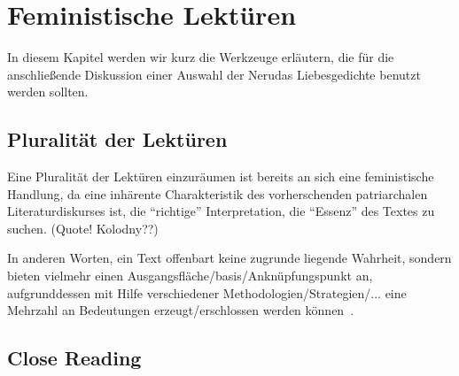 \section{Feministische Lektüren}

In diesem Kapitel werden wir kurz die Werkzeuge erläutern, die für die anschließende Diskussion einer Auswahl der Nerudas Liebesgedichte benutzt werden sollten.

\subsection{Pluralität der Lektüren}

Eine Pluralität der Lektüren einzuräumen ist bereits an sich eine feministische Handlung,
da eine inhärente Charakteristik des vorherschenden patriarchalen Literaturdiskurses ist, die ``richtige'' Interpretation, die ``Essenz'' des Textes zu suchen. (Quote! Kolodny??)
\begin{comment}
   * Pluralität (vlt in die Intro vorziehen)
     Annette Kolodny: "In my view, our purpose is not and should not be the formulation of any single reading method or potentially procrustean set of critical procedures[...] Instead, as I se it, our task is to initiate nothing less than a playful pluralism, responsice to the possibilities of multiple critical schools and methods, but captive of none.."
\end{comment}

In anderen Worten, ein Text offenbart keine zugrunde liegende Wahrheit, sondern bieten vielmehr einen Ausgangsfläche/basis/Anknüpfungspunkt an, aufgrunddessen mit Hilfe verschiedener Methodologien/Strategien/... eine Mehrzahl an Bedeutungen erzeugt/erschlossen werden können~\autocite{Beehler1988}.

\begin{comment}
[Beehler1988]
"Consequently, what we teach in the English class-
room is not "literature" but ways of reading. By
helping students to identify different methods,
different positions from which to view a work, we
help them to realize that texts do not "reveal"
truth: they simply provide the field upon which
meanings can be produced."
\end{comment}

\subsection{Close Reading}

